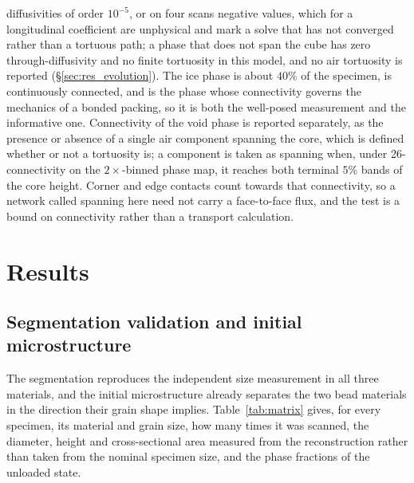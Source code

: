 \documentclass[preprint,12pt,numbers]{elsarticle}
\begin{document}
  diffusivities of order $10^{-5}$, or on four scans negative values, which
  for a longitudinal coefficient are unphysical and mark a solve that has not
  converged rather than a tortuous path; a phase that does not span the cube
  has zero through-diffusivity and no finite tortuosity in this model, and no
  air tortuosity is reported (\S\ref{sec:res_evolution}).  The ice phase is about $40\%$ of the specimen,
  is continuously connected, and is the phase whose connectivity governs the
  mechanics of a bonded packing, so it is both the well-posed measurement and
  the informative one.  Connectivity of the void phase is reported separately,
  as the presence or absence of a single air component spanning the core,
  which is defined whether or not a tortuosity is; a component is taken as
  spanning when, under 26-connectivity on the $2\times$-binned phase map, it
  reaches both terminal $5\%$ bands of the core height.  Corner and edge
  contacts count towards that connectivity, so a network called spanning here
  need not carry a face-to-face flux, and the test is a bound on connectivity
  rather than a transport calculation.

  \section{Results}
  \label{sec:results}

  \subsection{Segmentation validation and initial microstructure}
  \label{sec:res_microstructure}

  The segmentation reproduces the independent size measurement in all three
  materials, and the initial microstructure already separates the two bead
  materials in the direction their grain shape implies.  Table~\ref{tab:matrix}
  gives, for every specimen, its material and grain size, how many times it
  was scanned, the diameter, height and cross-sectional area measured from the
  reconstruction rather than taken from the nominal specimen size, and the
  phase fractions of the unloaded state.
\end{document}
